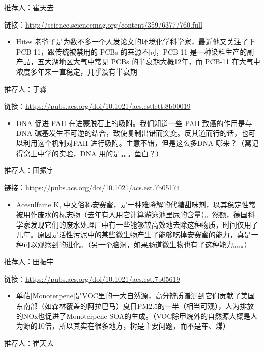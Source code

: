 \documentclass[]{book}
\providecommand{\tightlist}{%
  \setlength{\itemsep}{0pt}\setlength{\parskip}{0pt}}
\begin{document}
推荐人：崔天去

链接：\url{http://science.sciencemag.org/content/359/6377/760.full}

\begin{itemize}
\tightlist
\item
  Hites 老爷子是为数不多一个人发论文的环境化学科学家，最近他又关注了下
  PCB-11，跟传统被禁用的 PCBs 的来源不同，PCB-11
  是一种染料生产的副产品，五大湖地区大气中常见 PCBs 的半衰期大概12年，而
  PCB-11 在大气中浓度多年来一直稳定，几乎没有半衰期
\end{itemize}

推荐人：于淼

链接：\url{https://pubs.acs.org/doi/10.1021/acs.estlett.8b00019}

\begin{itemize}
\tightlist
\item
  DNA 促进 PAH 在进蒙脱石上的吸附。我们知道一些 PAH 致癌的作用是与DNA
  碱基发生不可逆的结合，致使复制出错而突变。反其道而行的话，也可以利用这个机制对PAH
  进行吸附。主意不错，但是这么多DNA 哪来？（窝记得窝上中学的实验，DNA
  用的是。。。鱼白？）
\end{itemize}

推荐人：田振宇

链接：\url{https://pubs.acs.org/doi/10.1021/acs.est.7b05174}

\begin{itemize}
\tightlist
\item
  Acesulfame K,
  中文俗称安赛蜜，是一种难降解的代糖甜味剂，以其稳定性常被用作废水的标志物（去年有人用它计算游泳池里尿的含量）。然额，德国科学家发现它们的废水处理厂中有一些能够较高效地去除这种物质，时间仅用了几年。原因是活性污泥中的某些微生物产生了能够吃掉安赛蜜的能力，真是一种可以观察到的进化。（另一个脑洞，如果肠道微生物也有了这种能力。。。）
\end{itemize}

推荐人：田振宇

链接：\url{https://pubs.acs.org/doi/10.1021/acs.est.7b05619}

\begin{itemize}
\tightlist
\item
  单萜{[}Monoterpene{]}是VOC里的一大自然源，高分辨质谱测到它们贡献了美国东南部（如森林覆盖的阿拉巴马）夏日PM2.5的一半（相当可观），人为排放的NOx也促进了Monoterpene-SOA的生成。（VOC除甲烷外的自然源大概是人为源的10倍，所以其实在很多地方，树是主要问题，而不是车、煤）
\end{itemize}

推荐人：崔天去
\end{document}
